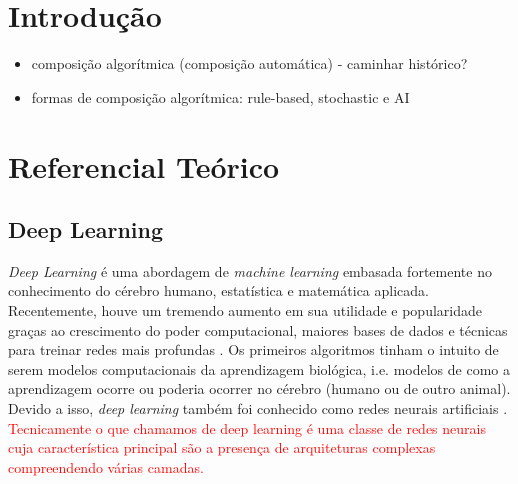 \documentclass{automatextcc}
\newcommand{\pumi}[1]{\textcolor{red}{#1}}
\begin{document}
\listoftables




\chapter{Introdução}

\begin{itemize}
    \item composição algorítmica (composição automática) - caminhar histórico?
    \item formas de composição algorítmica: rule-based, stochastic e AI
\end{itemize}





\chapter{Referencial Teórico}


\section{Deep Learning}
\textit{Deep Learning} é uma abordagem de \textit{machine learning} embasada fortemente no conhecimento do cérebro humano, estatística e matemática aplicada. Recentemente, houve um tremendo aumento em sua utilidade e popularidade graças ao crescimento do poder computacional, maiores bases de dados e técnicas para treinar redes mais profundas \citep{mit2016deeplearningbook}. Os primeiros algoritmos tinham o intuito de serem modelos computacionais da aprendizagem biológica, i.e. modelos de como a aprendizagem ocorre ou poderia ocorrer no cérebro (humano ou de outro animal). Devido a isso, \textit{deep learning} também foi conhecido como redes neurais artificiais \citep{mit2016deeplearningbook}. \pumi{Tecnicamente o que chamamos de deep learning é uma classe de redes neurais cuja característica principal são a presença de arquiteturas complexas compreendendo várias camadas. }
\end{document}
